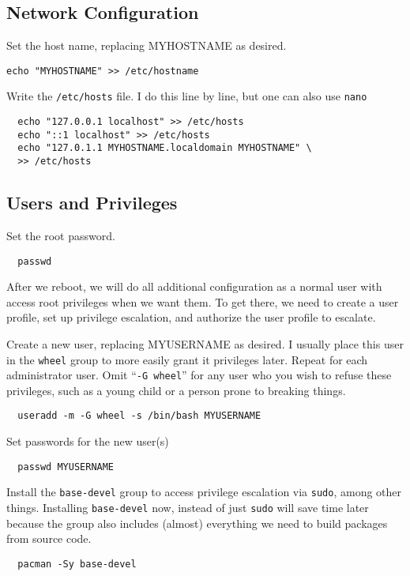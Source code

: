 \documentclass[letterpaper,12pt]{article}
\newcommand{\p}{\par\bigskip}
\begin{document}
\subsection{Network Configuration}
Set the host name, replacing MYHOSTNAME as desired.
\begin{lstlisting}
echo "MYHOSTNAME" >> /etc/hostname
\end{lstlisting} \p

Write the {\tt /etc/hosts} file. I do this line by line, but one can also use {\tt nano}
\begin{lstlisting}
  echo "127.0.0.1 localhost" >> /etc/hosts
  echo "::1 localhost" >> /etc/hosts
  echo "127.0.1.1 MYHOSTNAME.localdomain MYHOSTNAME" \
  >> /etc/hosts
\end{lstlisting}


\subsection{Users and Privileges}
Set the root password.
\begin{lstlisting}
  passwd
\end{lstlisting} \p

After we reboot, we will do all additional configuration as a normal user with access root privileges when we want them. To get there, we need to create a user profile, set up privilege escalation, and authorize the user profile to escalate. \p

Create a new user, replacing MYUSERNAME as desired. I usually place this user in the {\tt wheel} group to more easily grant it privileges later. Repeat for each administrator user. Omit ``{\tt -G wheel}'' for any user who you wish to refuse these privileges, such as a young child or a person prone to breaking things.
\begin{lstlisting}
  useradd -m -G wheel -s /bin/bash MYUSERNAME
\end{lstlisting} \p

Set passwords for the new user(s)
\begin{lstlisting}
  passwd MYUSERNAME
\end{lstlisting}

Install the {\tt base-devel} group to access privilege escalation via {\tt sudo}, among other things. Installing {\tt base-devel} now, instead of just {\tt sudo} will save time later because the group also includes (almost) everything we need to build packages from source code.
\begin{lstlisting}
  pacman -Sy base-devel
\end{lstlisting} \p
\end{document}
